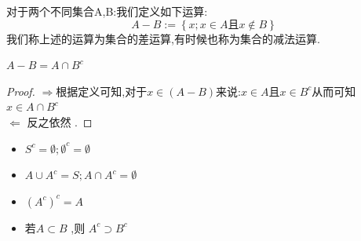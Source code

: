 \begin{Definition}
    对于两个不同集合A,B:我们定义如下运算:
    \[A-B := \left\{x ; x\in A \text{且} x \notin B\right\}\]
    我们称上述的运算为集合的差运算,有时候也称为集合的减法运算.
\end{Definition}
\begin{Theorem}
   \(A-B = A \cap B^c\)
\end{Theorem}
\begin{proof}
   \(\Rightarrow\)根据定义可知,对于\(x\in (A-B)\)来说:\(x \in A\)且\(x \in B^c\)从而可知\(x \in A \cap B^c\) \\ 
   \(\Leftarrow\) 反之依然 .
\end{proof}
\begin{Theorem}
    \begin{itemize}[itemsep=2pt,topsep=0pt,parsep=0pt]
        给定一个集合S,A是S的子集
        \item \(S^c = \emptyset ; \emptyset^c = \emptyset \) \\ 
        \item \(A \cup A^c = S ; A \cap A^c = \emptyset \)\\
        \item \((A^c)^c = A \)\\
        \item 若\(A \subset B \) ,则 \(A^c \supset B^c\)
    \end{itemize}
\end{Theorem}

